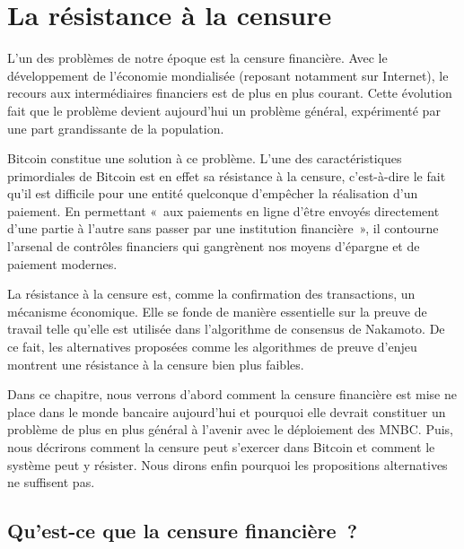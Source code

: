 
\chapter{La résistance à la censure}
\label{ch:censure}

L'un des problèmes de notre époque est la censure financière. Avec le développement de l'économie mondialisée (reposant notamment sur Internet), le recours aux intermédiaires financiers est de plus en plus courant. Cette évolution fait que le problème devient aujourd'hui un problème général, expérimenté par une part grandissante de la population.

Bitcoin constitue une solution à ce problème. L'une des caractéristiques primordiales de Bitcoin est en effet sa résistance à la censure, c'est-à-dire le fait qu'il est difficile pour une entité quelconque d'empêcher la réalisation d'un paiement. En permettant «~aux paiements en ligne d'être envoyés directement d'une partie à l'autre sans passer par une institution financière~», il contourne l'arsenal de contrôles financiers qui gangrènent nos moyens d'épargne et de paiement modernes.

La résistance à la censure est, comme la confirmation des transactions, un mécanisme économique. Elle se fonde de manière essentielle sur la preuve de travail telle qu'elle est utilisée dans l'algorithme de consensus de Nakamoto. De ce fait, les alternatives proposées comme les algorithmes de preuve d'enjeu montrent une résistance à la censure bien plus faibles.

Dans ce chapitre, nous verrons d'abord comment la censure financière est mise ne place dans le monde bancaire aujourd'hui et pourquoi elle devrait constituer un problème de plus en plus général à l'avenir avec le déploiement des MNBC. Puis, nous décrirons comment la censure peut s'exercer dans Bitcoin et comment le système peut y résister. Nous dirons enfin pourquoi les propositions alternatives ne suffisent pas.

\section*{Qu'est-ce que la censure financière~?}

%

